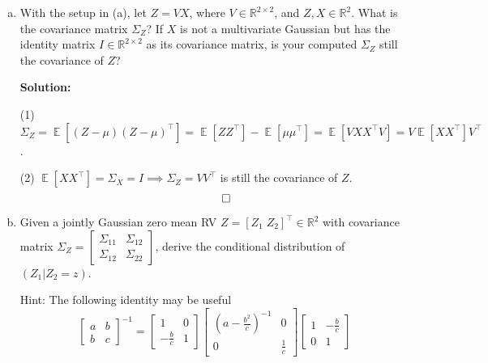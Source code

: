 \documentclass{article}
\DeclareMathOperator{\E}{\mathbb{E}}
\newenvironment{solution}{\color{blue} \smallskip \textbf{Solution:}}{}
\begin{document}
\begin{enumerate}[(a)]
\begin{solution}
        Uncorrelated and independent : $Z_1 = X_1$ and $Z_2 = X_2$.
        \[ \qedhere \]

    \end{solution}

    \item With the setup in (a), let $Z = V X$, where $V \in \mathbb{R}^{2 \times 2}$, and $Z, X \in \mathbb{R}^2$. What is the covariance matrix $\Sigma_Z$? If $X$ is not a multivariate Gaussian but has the identity matrix $I\in\mathbb R^{2\times 2}$ as its covariance matrix, is your computed $\Sigma_Z$ still the covariance of $Z$?

    \begin{solution}

        (1) $\Sigma_Z = \E[(Z-\mu)(Z-\mu)^\top]=\E[ZZ^\top]-\E[\mu\mu^\top]=\E[V X X^\top V]=V\E[XX^\top]V^\top$.

        (2) $\E[X X^\top] = \Sigma_X = I \implies \Sigma_Z = VV^\top$ is still the covariance of $Z$.
        \[ \qedhere \]

    \end{solution}

    \item Given a jointly Gaussian zero mean RV $Z = [Z_1\; Z_2]^\top\in \mathbb{R}^2$ with covariance matrix $\Sigma_Z = \begin{bmatrix} \Sigma_{11} & \Sigma_{12} \\ \Sigma_{12} & \Sigma_{22}\end{bmatrix}$, derive the conditional distribution of $(Z_1 | Z_2 = z)$.

    Hint: The following identity may be useful 
    \[
        \begin{bmatrix} a & b \\ b & c\end{bmatrix}^{-1} = \begin{bmatrix} 1 & 0 \\ -\frac{b}{c} & 1\end{bmatrix} \begin{bmatrix} \left(a - \frac{b^2}{c}\right)^{-1} & 0 \\ 0 & \frac{1}{c} \end{bmatrix}
        \begin{bmatrix} 1 &  -\frac{b}{c} \\ 0 & 1\end{bmatrix}
    \]


\end{enumerate}
\end{document}
